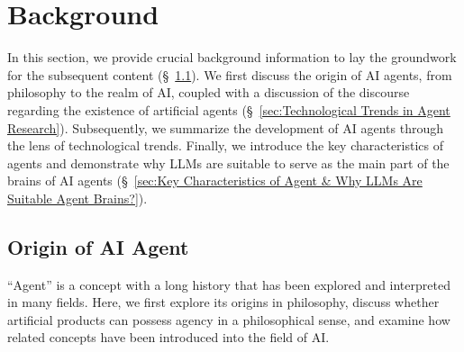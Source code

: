 \documentclass{article}
\begin{document}










\section{Background}\label{sec:Background}


In this section, we provide crucial background information to lay the groundwork for the subsequent content (\S \ \ref{sec:Origin of AI Agent}). 
We first discuss the origin of AI agents, from philosophy to the realm of AI, coupled with a discussion of the discourse regarding the existence of artificial agents (\S \ \ref{sec:Technological Trends in Agent Research}). 
Subsequently, we summarize the development of AI agents through the lens of technological trends. Finally, we introduce the key characteristics of agents and demonstrate why LLMs are suitable to serve as the main part of the brains of AI agents (\S \ \ref{sec:Key Characteristics of Agent & Why LLMs Are Suitable Agent Brains?}).


\subsection{Origin of AI Agent}\label{sec:Origin of AI Agent}
``Agent'' is a concept with a long history that has been explored and interpreted in many fields.
Here, we first explore its origins in philosophy, discuss whether artificial products can possess agency in a philosophical sense, and examine how related concepts have been introduced into the field of AI.
\end{document}
